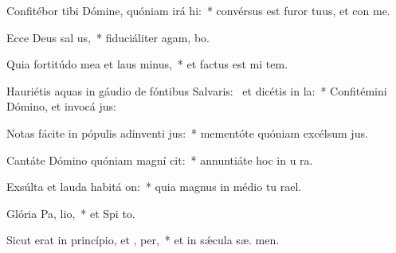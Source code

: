 \item Confitébor tibi Dómine, quóniam irá  hi:~* convérsus est furor tuus, et con  me.
\item Ecce Deus sal us,~* fiduciáliter agam,   bo.
\item Quia fortitúdo mea et laus  minus,~* et factus est mi  tem.
\item Hauriétis aquas in gáudio de fóntibus Salvaris:~\pscross{} et dicétis in  la:~* Confitémini Dómino, et invocá  jus:
\item Notas fácite in pópulis adinventi jus:~* mementóte quóniam excélsum   jus.
\item Cantáte Dómino quóniam magní cit:~* annuntiáte hoc in u ra.
\item Exsúlta et lauda habitá on:~* quia magnus in médio tu  rael.
\item Glória Pa,  lio,~* et Spi to.
\item Sicut erat in princípio, et ,  per,~* et in sǽcula sæ. men.
